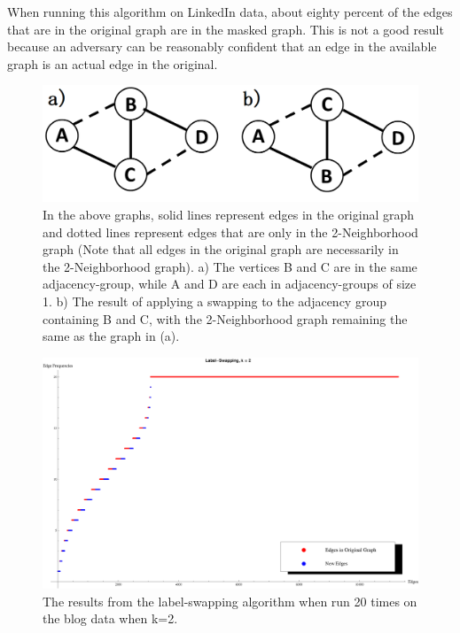 \indent When running this algorithm on LinkedIn data, about eighty percent of the edges that are in the original graph are in the masked graph. This is not a good result because an adversary can be reasonably confident that an edge in the available graph is an actual edge in the original. \\

\begin{figure}[ht]
  \centering
  \includegraphics[scale=0.3 ]{Sample-Graph.png}
  \caption{In the above graphs, solid lines represent edges in the original graph and dotted lines represent edges that are only in the 2-Neighborhood graph (Note that all edges in the original graph are necessarily in the 2-Neighborhood graph). a)  The vertices B and C are in the same adjacency-group, while A and D are each in adjacency-groups of size 1. b) The result of applying a swapping to the adjacency group containing B and C, with the 2-Neighborhood graph remaining the same as the graph in (a).}
  \label{fig:sample graph}
\end{figure}


\begin{figure}[ht]
  \centering
  \includegraphics[scale=0.4 ]{s40_k_2_nomerge.eps}
  \caption{The results from the label-swapping algorithm when run 20 times on the blog data when k=2.}
  \label{fig:s40-k=2-label-swap}
\end{figure}



